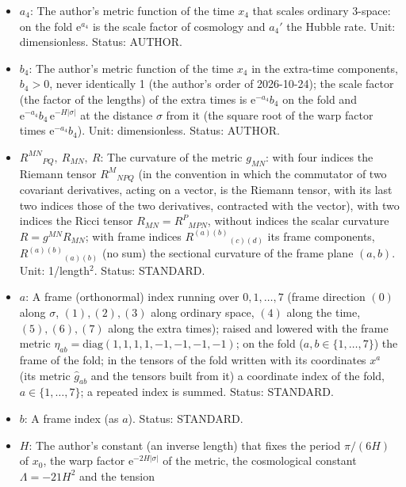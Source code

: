 \documentclass[
  10pt,
]{article}
\providecommand{\tightlist}{%
  \setlength{\itemsep}{0pt}\setlength{\parskip}{0pt}}
\begin{document}
\begin{itemize}
\tightlist
\item
  \(a_4\): The author's metric function of the time \(x_4\) that scales
  ordinary 3-space: on the fold \(\mathrm{e}^{a_4}\) is the scale factor
  of cosmology and \(a_4'\) the Hubble rate. Unit: dimensionless.
  Status: AUTHOR.
\item
  \(b_4\): The author's metric function of the time \(x_4\) in the
  extra-time components, \(b_4 > 0\), never identically 1 (the author's
  order of 2026-10-24); the scale factor (the factor of the lengths) of
  the extra times is \(\mathrm{e}^{-a_4}b_4\) on the fold and
  \(\mathrm{e}^{-a_4}b_4\,\mathrm{e}^{-H\lvert\sigma\rvert}\) at the
  distance \(\sigma\) from it (the square root of the warp factor times
  \(\mathrm{e}^{-a_4}b_4\)). Unit: dimensionless. Status: AUTHOR.
\item
  \(R^{MN}{}_{PQ},\ R_{MN},\ R\): The curvature of the metric
  \(g_{MN}\): with four indices the Riemann tensor \(R^M{}_{NPQ}\) (in
  the convention in which the commutator of two covariant derivatives,
  acting on a vector, is the Riemann tensor, with its last two indices
  those of the two derivatives, contracted with the vector), with two
  indices the Ricci tensor \(R_{MN} = R^P{}_{MPN}\), without indices the
  scalar curvature \(R = g^{MN}R_{MN}\); with frame indices
  \(R^{(a)(b)}{}_{(c)(d)}\) its frame components,
  \(R^{(a)(b)}{}_{(a)(b)}\) (no sum) the sectional curvature of the
  frame plane \((a, b)\). Unit: 1/length\(^2\). Status: STANDARD.
\item
  \(a\): A frame (orthonormal) index running over \(0, 1, \dots, 7\)
  (frame direction \((0)\) along \(\sigma\), \((1), (2), (3)\) along
  ordinary space, \((4)\) along the time, \((5), (6), (7)\) along the
  extra times); raised and lowered with the frame metric
  \(\eta_{ab} = \mathrm{diag}(1, 1, 1, 1, -1, -1, -1, -1)\); on the fold
  (\(a, b \in \{1, \dots, 7\}\)) the frame of the fold; in the tensors
  of the fold written with its coordinates \(x^a\) (its metric
  \(\hat g_{ab}\) and the tensors built from it) a coordinate index of
  the fold, \(a \in \{1, \dots, 7\}\); a repeated index is summed.
  Status: STANDARD.
\item
  \(b\): A frame index (as \(a\)). Status: STANDARD.
\item
  \(H\): The author's constant (an inverse length) that fixes the period
  \(\pi/(6H)\) of \(x_0\), the warp factor
  \(\mathrm{e}^{-2H\lvert\sigma\rvert}\) of the metric, the cosmological
  constant \(\Lambda = -21H^2\) and the tension

\end{itemize}
\end{document}
